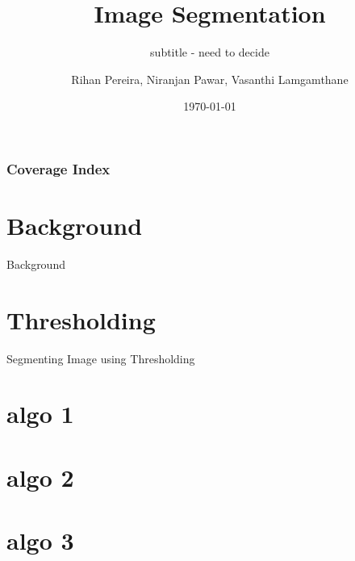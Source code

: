 \documentclass[9pt]{beamer}
\title{Image Segmentation}
\subtitle{subtitle - need to decide}
\author{Rihan Pereira, Niranjan Pawar, Vasanthi Lamgamthane}
\institute[California State University, Channel Islands]
{
  MSCS COMP 510 - Advanced Image Processing \& Analysis, Fall 2018\\
  Department of Computer Science\\
  California State University, Channel Islands
}
\date{\today}
\begin{document}
\begin{frame}[plain]
  \frametitle{}
  \titlepage
\end{frame}

\begin{frame}[plain]
  \frametitle{Coverage Index}
  \tableofcontents
\end{frame}


\section{Background}
\begin{frame}{Background}
  
\end{frame}


\section{Thresholding}
\begin{frame}{Segmenting Image using Thresholding}
  
\end{frame}


\section{algo 1}
\begin{frame}

\end{frame}


\section{algo 2}
\begin{frame}

\end{frame}


\section{algo 3}
\begin{frame}

\end{frame}
\end{document}

